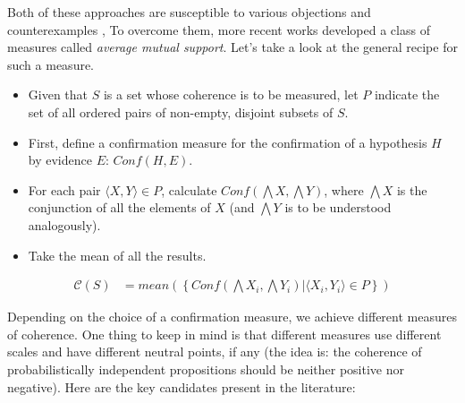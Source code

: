 \documentclass[10pt,]{scrartcl}
\begin{document}
Both of these approaches are susceptible to various objections and counterexamples \citep{Merricks1995,shogenji1999conducive, Akiba2000Shogenjis, Shogenji2001Reply, bovens2004bayesian,Siebel2004On-Fitelsons-me,siebel2006against,Shogenji2006Why,crupi2007BayesianMeasuresEvidential, koscholke2016evaluating, Schippers2019General}, To overcome them, more  recent works developed  a class of measures called
\textit{average mutual support}. Let’s take a look at  the general recipe for such a measure.


\begin{itemize}
\item
  Given that \(S\) is a set whose coherence is to be measured, let \(P\)
  indicate the set of all ordered pairs of non-empty, disjoint subsets
  of \(S\).
\item
  First, define a confirmation measure for the confirmation of a hypothesis \(H\) by evidence  \(E\): \(Conf(H,E)\).
\item
  For each pair \(\langle X, Y \rangle \in P\), calculate
  \(Conf(\bigwedge X, \bigwedge Y)\), where $\bigwedge X$  is the conjunction of all the elements of $X$ (and $\bigwedge Y$ is to be understood analogously).
\item
  Take the mean of all the results.
\end{itemize}\begin{align*}
    \mathcal{C}(S) & =
mean\left(\left\{Conf(\bigwedge X_i, \bigwedge Y_i) | \langle X_i, Y_i \rangle \in P\right\} \right)
\end{align*}

\noindent Depending on the choice of a confirmation measure, we achieve
different measures of coherence.  One thing to keep in mind is
that different measures use different scales and have different neutral points, if any (the idea is: the coherence of probabilistically independent propositions should be neither positive nor
negative). Here are the key candidates present in the literature:
\end{document}
